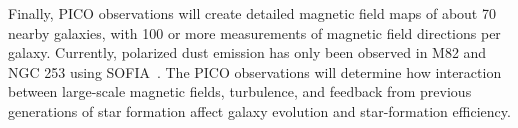 \documentclass[PICOAPC.tex]{subfiles}
\begin{document}
Finally, PICO observations will create detailed magnetic field maps of about 70 nearby galaxies, with 100 or more measurements of magnetic field directions per galaxy. Currently, polarized dust emission has only been observed in M82 and NGC 253 using SOFIA~\citep{Jonesetal}. The PICO observations will determine how interaction between large-scale magnetic fields, turbulence, and feedback from previous generations of star formation affect galaxy evolution and star-formation efficiency.
\end{document}
